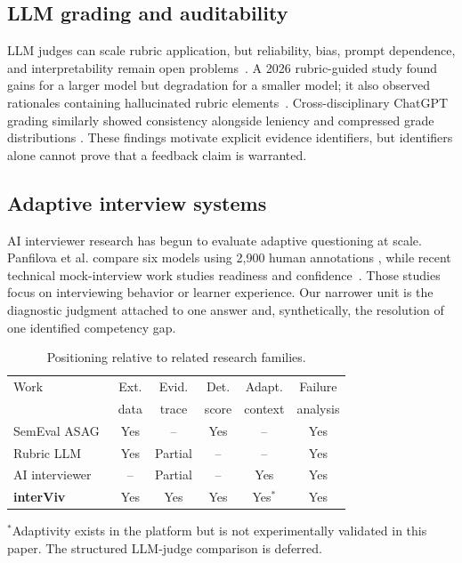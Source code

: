 \documentclass[conference,a4paper]{IEEEtran}
\begin{document}
\subsection{LLM grading and auditability}

LLM judges can scale rubric application, but reliability, bias, prompt
dependence, and interpretability remain open problems~\cite{haque2026,gu2026}.
A 2026 rubric-guided study found gains for a larger model but degradation for a
smaller model; it also observed rationales containing hallucinated rubric
elements~\cite{haque2026}. Cross-disciplinary ChatGPT grading similarly showed
consistency alongside leniency and compressed grade distributions
\cite{awashreh2026}. These findings motivate explicit evidence identifiers, but
identifiers alone cannot prove that a feedback claim is warranted.

\subsection{Adaptive interview systems}

AI interviewer research has begun to evaluate adaptive questioning at scale.
Panfilova et al. compare six models using 2,900 human annotations
\cite{panfilova2026}, while recent technical mock-interview work studies
readiness and confidence~\cite{gomez2025}. Those studies focus on interviewing
behavior or learner experience. Our narrower unit is the diagnostic judgment
attached to one answer and, synthetically, the resolution of one identified
competency gap.

\begin{table}[t]
\caption{Positioning relative to related research families.}
\label{tab:related-comparison}
\centering
\scriptsize
\setlength{\tabcolsep}{2.5pt}
\begin{tabular}{@{}lccccc@{}}
\toprule
Work & Ext. & Evid. & Det. & Adapt. & Failure \\
     & data & trace & score & context & analysis \\
\midrule
SemEval ASAG~\cite{dzikovska2013} & Yes & -- & Yes & -- & Yes \\
Rubric LLM~\cite{haque2026} & Yes & Partial & -- & -- & Yes \\
AI interviewer~\cite{panfilova2026} & -- & Partial & -- & Yes & Yes \\
\textbf{interViv} & Yes & Yes & Yes & Yes$^{*}$ & Yes \\
\bottomrule
\end{tabular}

\vspace{2pt}
\raggedright\scriptsize
$^{*}$Adaptivity exists in the platform but is not experimentally validated in
this paper. The structured LLM-judge comparison is deferred.
\end{table}
\end{document}
